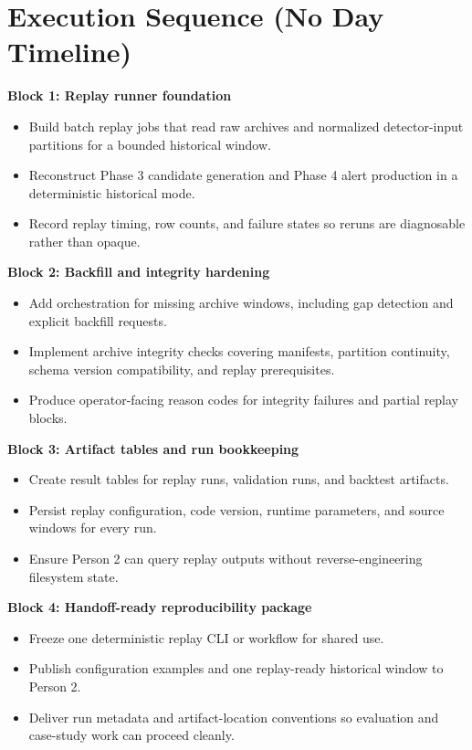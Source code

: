 \documentclass{article}
\begin{document}
\section*{Execution Sequence (No Day Timeline)}
\textbf{Block 1: Replay runner foundation}
\begin{itemize}
\item Build batch replay jobs that read raw archives and normalized detector-input partitions for a bounded historical window.
\item Reconstruct Phase 3 candidate generation and Phase 4 alert production in a deterministic historical mode.
\item Record replay timing, row counts, and failure states so reruns are diagnosable rather than opaque.
\end{itemize}

\textbf{Block 2: Backfill and integrity hardening}
\begin{itemize}
\item Add orchestration for missing archive windows, including gap detection and explicit backfill requests.
\item Implement archive integrity checks covering manifests, partition continuity, schema version compatibility, and replay prerequisites.
\item Produce operator-facing reason codes for integrity failures and partial replay blocks.
\end{itemize}

\textbf{Block 3: Artifact tables and run bookkeeping}
\begin{itemize}
\item Create result tables for replay runs, validation runs, and backtest artifacts.
\item Persist replay configuration, code version, runtime parameters, and source windows for every run.
\item Ensure Person 2 can query replay outputs without reverse-engineering filesystem state.
\end{itemize}

\textbf{Block 4: Handoff-ready reproducibility package}
\begin{itemize}
\item Freeze one deterministic replay CLI or workflow for shared use.
\item Publish configuration examples and one replay-ready historical window to Person 2.
\item Deliver run metadata and artifact-location conventions so evaluation and case-study work can proceed cleanly.
\end{itemize}
\end{document}
